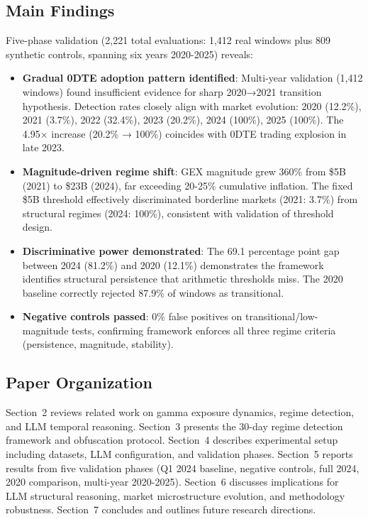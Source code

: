 \subsection{Main Findings}

Five-phase validation (2,221 total evaluations: 1,412 real windows plus 809 synthetic controls, spanning six years 2020-2025) reveals:

\begin{itemize}
\item \textbf{Gradual 0DTE adoption pattern identified}: Multi-year validation (1,412 windows) found insufficient evidence for sharp 2020→2021 transition hypothesis. Detection rates closely align with market evolution: 2020 (12.2\%), 2021 (3.7\%), 2022 (32.4\%), 2023 (20.2\%), 2024 (100\%), 2025 (100\%). The 4.95× increase (20.2\% → 100\%) coincides with 0DTE trading explosion in late 2023.

\item \textbf{Magnitude-driven regime shift}: GEX magnitude grew 360\% from \$5B (2021) to \$23B (2024), far exceeding 20-25\% cumulative inflation. The fixed \$5B threshold effectively discriminated borderline markets (2021: 3.7\%) from structural regimes (2024: 100\%), consistent with validation of threshold design.

\item \textbf{Discriminative power demonstrated}: The 69.1 percentage point gap between 2024 (81.2\%) and 2020 (12.1\%) demonstrates the framework identifies structural persistence that arithmetic thresholds miss. The 2020 baseline correctly rejected 87.9\% of windows as transitional.

\item \textbf{Negative controls passed}: 0\% false positives on transitional/low-magnitude tests, confirming framework enforces all three regime criteria (persistence, magnitude, stability).
\end{itemize}

\subsection{Paper Organization}

Section~2 reviews related work on gamma exposure dynamics, regime detection, and LLM temporal reasoning. Section~3 presents the 30-day regime detection framework and obfuscation protocol. Section~4 describes experimental setup including datasets, LLM configuration, and validation phases. Section~5 reports results from five validation phases (Q1 2024 baseline, negative controls, full 2024, 2020 comparison, multi-year 2020-2025). Section~6 discusses implications for LLM structural reasoning, market microstructure evolution, and methodology robustness. Section~7 concludes and outlines future research directions.
